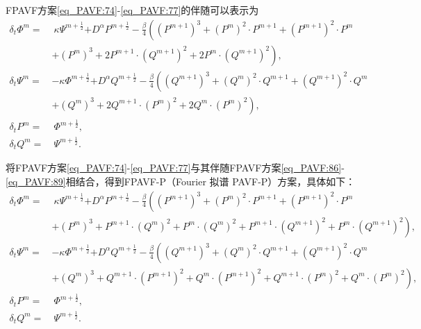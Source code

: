 FPAVF方案\eqref{eq_PAVF:74}-\eqref{eq_PAVF:77}的伴随可以表示为
\begin{align}
\delta_{t} \varPhi^{m}=&~\kappa \Psi^{m+\frac{1}{2}}{+D^{\alpha} P^{m+\frac{1}{2}}}-\frac{\beta}{4}\left( (P^{m+1})^3+ (P^{m})^{2}\cdot P^{m+1}+(P^{m+1})^{2}\cdot P^{m}\right.\nonumber\\
	&\left.+ (P^{m})^{3}+2 P^{m+1}\cdot (Q^{m+1})^{2}+2 P^{m}\cdot (Q^{m+1})^{2}\right),\label{eq_PAVF:86}\\
\delta_{t} \Psi^{m}=&-\kappa \varPhi^{m+\frac{1}{2}}{+D^{\alpha} Q^{m+\frac{1}{2}}}-\frac{\beta}{4}\left( (Q^{m+1})^3+ (Q^{m})^{2}\cdot Q^{m+1}+ (Q^{m+1})^{2}\cdot Q^{m}\right.\nonumber\\
	&\left.+ (Q^{m})^{3}+2 Q^{m+1}\cdot (P^{m})^{2}+2 Q^{m}\cdot (P^{m})^{2}\right),\label{eq_PAVF:87}\\
\delta_{t} P^{m}=&~\varPhi^{m+\frac{1}{2}},\label{eq_PAVF:88}\\
\delta_{t} Q^{m}=&~\Psi^{m+\frac{1}{2}}.\label{eq_PAVF:89}
\end{align}

将FPAVF方案\eqref{eq_PAVF:74}-\eqref{eq_PAVF:77}与其伴随FPAVF方案\eqref{eq_PAVF:86}-\eqref{eq_PAVF:89}相结合，得到FPAVF-P（Fourier 拟谱 PAVF-P）方案，具体如下：
\begin{align}
\delta_{t} \varPhi^{m}=&~\kappa \Psi^{m+\frac{1}{2}}{+D^{\alpha} P^{m+\frac{1}{2}}}-\frac{\beta}{4}\left((P^{m+1})^3+(P^{m})^{2}\cdot P^{m+1}+(P^{m+1})^{2}\cdot P^{m}\right.\nonumber\\
	&\left.+(P^{m})^{3}+P^{m+1}\cdot (Q^{m})^{2}+P^{m}\cdot (Q^{m})^{2}+P^{m+1}\cdot (Q^{m+1})^{2}+P^{m}\cdot (Q^{m+1})^{2}\right),\label{eq_PAVF:98}\\
\delta_{t} \Psi^{m}=&-\kappa \varPhi^{m+\frac{1}{2}}{+D^{\alpha} Q^{m+\frac{1}{2}}}-\frac{\beta}{4}\left((Q^{m+1})^3+(Q^{m})^{2}\cdot Q^{m+1}+(Q^{m+1})^{2}\cdot Q^{m}\right.\nonumber\\
	&\left.+(Q^{m})^{3}+Q^{m+1}\cdot (P^{m+1})^{2}+Q^{m}\cdot (P^{m+1})^{2}+Q^{m+1}\cdot (P^{m})^{2}+Q^{m}\cdot (P^{m})^{2}\right),\label{eq_PAVF:99}\\
\delta_{t} P^{m}=&~\varPhi^{m+\frac{1}{2}},\label{eq_PAVF:100}\\
\delta_{t} Q^{m}=&~\Psi^{m+\frac{1}{2}}.\label{eq_PAVF:101}
\end{align}

